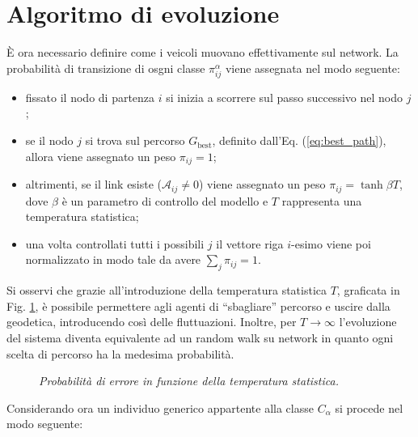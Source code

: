 \documentclass[../main.tex]{subfiles}
\begin{document}
\section{Algoritmo di evoluzione}
\`E ora necessario definire come i veicoli muovano effettivamente sul network.
La probabilit\`a di transizione di osgni classe $\pi_{ij}^{\alpha}$ viene assegnata nel modo seguente:
\begin{itemize}
    \item fissato il nodo di partenza $i$ si inizia a scorrere sul passo successivo nel nodo $j$;
    \item se il nodo $j$ si trova sul percorso $G_{\text{best}}$, definito dall'Eq. (\ref{eq:best_path}), allora viene assegnato un peso $\pi_{ij}=1$;
    \item altrimenti, se il link esiste ($\mathcal{A}_{ij} \neq 0$) viene assegnato un peso $\pi_{ij}=\tanh \beta T$, dove $\beta$ \`e un parametro di controllo del modello e $T$ rappresenta una temperatura statistica;
    \item una volta controllati tutti i possibili $j$ il vettore riga $i$-esimo viene poi normalizzato in modo tale da avere $\sum_j\pi_{ij}=1$.
\end{itemize}
Si osservi che grazie all'introduzione della temperatura statistica $T$, graficata in Fig. \ref{fig:temperature}, \`e possibile permettere agli agenti di ``sbagliare'' percorso e uscire dalla geodetica, introducendo cos\`i delle fluttuazioni.
Inoltre, per $T \to \infty$ l'evoluzione del sistema diventa equivalente ad un random walk su network in quanto ogni scelta di percorso ha la medesima probabilit\`a.
\begin{figure}[H]
    \centering
    \caption[Temperatura statistica]{\emph{Probabilit\`a di errore in funzione della temperatura statistica.}}
    \label{fig:temperature}
\end{figure}
Considerando ora un individuo generico appartente alla classe $C_{\alpha}$ si procede nel modo seguente:
\end{document}
